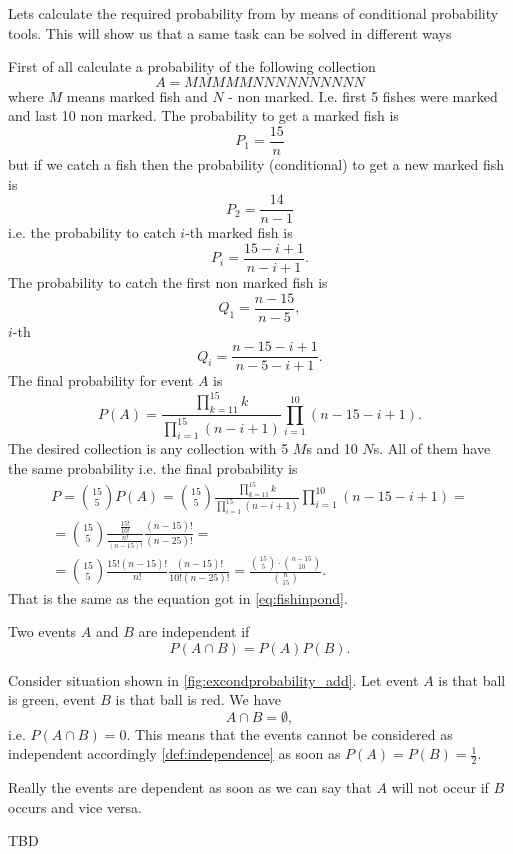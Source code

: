 Lets calculate the required probability from 
by means of conditional probability tools. This will show us that a
same task can be solved in different ways
\begin{example}
\label{ex:fishinpond_cond}
First of all calculate a probability of the following collection
\[
A = MMMMMNNNNNNNNNN
\]
where $M$ means marked fish and $N$ - non marked. I.e. first 5 fishes
were marked and last 10 non marked.
The probability to get a marked fish is
\[
P_1 = \frac{15}{n}
\]
but if we catch a fish then the probability (conditional) to get a new
marked fish is
\[
P_2 = \frac{14}{n-1}
\]
i.e. the probability to catch $i$-th marked fish is
\[
P_i = \frac{15-i+1}{n - i + 1}.
\]
The probability to catch the first non marked fish is
\[
Q_1 = \frac{n - 15}{n - 5},
\]
$i$-th
\[
Q_i = \frac{n -15 -i + 1}{n - 5 - i + 1}.
\]
The final probability for event $A$ is
\[
P(A) = \frac{\prod_{k=11}^{15}k}{\prod_{i =
    1}^{15}{\left(n -i + 1\right)}}\prod_{i=1}^{10}{\left(n - 15 - i + 1\right)}.
\]
The desired collection is any collection with 5 $M$s and 10 $N$s. All
of them have the same probability i.e. the final probability is
\begin{eqnarray}
P = \binom{15}{5} P(A) = \binom{15}{5}
\frac{ \prod_{k=11}^{15}k}{\prod_{i = 1}^{15}{\left(n - i +
    1\right)}}\prod_{i=1}^{10}{\left(n - 15 - i + 1\right)} = 
\nonumber \\
= \binom{15}{5}
\frac{\frac{15!}{10!}}{\frac{n!}{(n-15)!}}\frac{(n-15)!}{(n-25)!} = 
\nonumber \\
= \binom{15}{5}
\frac{15!(n-15)!}{n!}
\frac{(n-15)!}{10! (n-25)!} =
\frac{\binom{15}{5} \cdot \binom{n - 15}{10}}{\binom{n}{15}}.
\nonumber
\end{eqnarray}
That is the same as the equation got in \eqref{eq:fishinpond}.
\end{example}


\begin{definition}[Independence]
\label{def:independence}
Two events $A$ and $B$ are independent if 
\[
P\left(A \cap B\right) = 
P\left(A\right) P\left(B\right). 
\]
\end{definition}

\begin{example}
Consider situation shown in \cref{fig:excondprobability_add}. Let
event $A$ is that ball is green, event $B$ is that ball is red. We
have
\[
A \cap B = \emptyset, 
\]
i.e. $P\left(A \cap B\right) = 0$. This means that the events cannot
be considered as independent accordingly \cref{def:independence} as
soon as $P\left(A\right) = 
P\left(B\right) = \frac{1}{2}$.

Really the events are dependent as soon as we can say that $A$ will
not occur if $B$ occurs and vice versa.
\end{example}

TBD \cite{bib:kolmogorov74basic}
